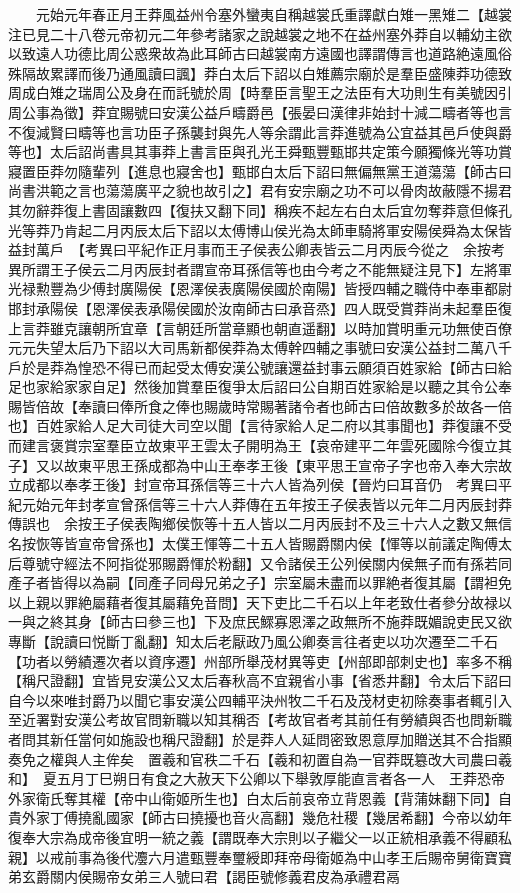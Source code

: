 　　元始元年春正月王莽風益州令塞外蠻夷自稱越裳氏重譯獻白雉一黑雉二【越裳注已見二十八卷元帝初元二年參考諸家之說越裳之地不在益州塞外莽自以輔幼主欲以致遠人功德比周公惑衆故為此耳師古曰越裳南方遠國也譯謂傳言也道路絶遠風俗殊隔故累譯而後乃通風讀曰諷】莽白太后下詔以白雉薦宗廟於是羣臣盛陳莽功德致周成白雉之瑞周公及身在而託號於周【時羣臣言聖王之法臣有大功則生有美號因引周公事為徵】莽宜賜號曰安漢公益戶疇爵邑【張晏曰漢律非始封十減二疇者等也言不復減賢曰疇等也言功臣子孫襲封與先人等余謂此言莽進號為公宜益其邑戶使與爵等也】太后詔尚書具其事莽上書言臣與孔光王舜甄豐甄邯共定策今願獨條光等功賞寢置臣莽勿隨輩列【進息也寢舍也】甄邯白太后下詔曰無偏無黨王道蕩蕩【師古曰尚書洪範之言也蕩蕩廣平之貌也故引之】君有安宗廟之功不可以骨肉故蔽隱不揚君其勿辭莽復上書固讓數四【復扶又翻下同】稱疾不起左右白太后宜勿奪莽意但條孔光等莽乃肯起二月丙辰太后下詔以太傅博山侯光為太師車騎將軍安陽侯舜為太保皆益封萬戶　【考異曰平紀作正月事而王子侯表公卿表皆云二月丙辰今從之　余按考異所謂王子侯云二月丙辰封者謂宣帝耳孫信等也由今考之不能無疑注見下】左將軍光禄勲豐為少傅封廣陽侯【恩澤侯表廣陽侯國於南陽】皆授四輔之職侍中奉車都尉邯封承陽侯【恩澤侯表承陽侯國於汝南師古曰承音烝】四人既受賞莽尚未起羣臣復上言莽雖克讓朝所宜章【言朝廷所當章顯也朝直遥翻】以時加賞明重元功無使百僚元元失望太后乃下詔以大司馬新都侯莽為太傅幹四輔之事號曰安漢公益封二萬八千戶於是莽為惶恐不得已而起受太傅安漢公號讓還益封事云願須百姓家給【師古曰給足也家給家家自足】然後加賞羣臣復爭太后詔曰公自期百姓家給是以聽之其令公奉賜皆倍故【奉讀曰俸所食之俸也賜歲時常賜著諸令者也師古曰倍故數多於故各一倍也】百姓家給人足大司徒大司空以聞【言待家給人足二府以其事聞也】莽復讓不受而建言褒賞宗室羣臣立故東平王雲太子開明為王【哀帝建平二年雲死國除今復立其子】又以故東平思王孫成都為中山王奉孝王後【東平思王宣帝子字也帝入奉大宗故立成都以奉孝王後】封宣帝耳孫信等三十六人皆為列侯【晉灼曰耳音仍　考異曰平紀元始元年封孝宣曾孫信等三十六人莽傳在五年按王子侯表皆以元年二月丙辰封莽傳誤也　余按王子侯表陶鄉侯恢等十五人皆以二月丙辰封不及三十六人之數又無信名按恢等皆宣帝曾孫也】太僕王惲等二十五人皆賜爵關内侯【惲等以前議定陶傅太后尊號守經法不阿指從邪賜爵惲於粉翻】又令諸侯王公列侯關内侯無子而有孫若同產子者皆得以為嗣【同產子同母兄弟之子】宗室屬未盡而以罪絶者復其屬【謂袒免以上親以罪絶屬藉者復其屬藉免音問】天下吏比二千石以上年老致仕者參分故禄以一與之終其身【師古曰參三也】下及庶民鰥寡恩澤之政無所不施莽既媚說吏民又欲專斷【說讀曰悦斷丁亂翻】知太后老厭政乃風公卿奏言往者吏以功次遷至二千石【功者以勞績遷次者以資序遷】州部所舉茂材異等吏【州部即部刺史也】率多不稱【稱尺證翻】宜皆見安漢公又太后春秋高不宜親省小事【省悉井翻】令太后下詔曰自今以來唯封爵乃以聞它事安漢公四輔平決州牧二千石及茂材吏初除奏事者輒引入至近署對安漢公考故官問新職以知其稱否【考故官者考其前任有勞績與否也問新職者問其新任當何如施設也稱尺證翻】於是莽人人延問密致恩意厚加贈送其不合指顯奏免之權與人主侔矣　置羲和官秩二千石【羲和初置自為一官莽既簒改大司農曰羲和】　夏五月丁巳朔日有食之大赦天下公卿以下舉敦厚能直言者各一人　王莽恐帝外家衛氏奪其權【帝中山衛姬所生也】白太后前哀帝立背恩義【背蒲妹翻下同】自貴外家丁傅撓亂國家【師古曰撓擾也音火高翻】幾危社稷【幾居希翻】今帝以幼年復奉大宗為成帝後宜明一統之義【謂既奉大宗則以子繼父一以正統相承義不得顧私親】以戒前事為後代灋六月遣甄豐奉璽綬即拜帝母衛姬為中山孝王后賜帝舅衛寶寶弟玄爵關内侯賜帝女弟三人號曰君【謁臣號修義君皮為承禮君鬲